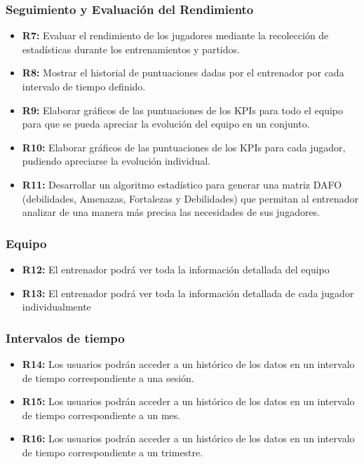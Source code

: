 \subsubsection{Seguimiento y Evaluación del Rendimiento}
\begin{itemize}
    \item \textbf{R7:} Evaluar el rendimiento de los jugadores mediante la recolección de estadísticas durante los entrenamientos y partidos.
    
    \item \textbf{R8:} Mostrar el historial de puntuaciones dadas por el entrenador por cada intervalo de  tiempo definido.
    
    \item \textbf{R9:} Elaborar gráficos de las puntuaciones de los KPIs para todo el equipo para que se pueda apreciar la evolución del equipo en un conjunto.
    
    \item \textbf{R10:} Elaborar gráficos de las puntuaciones de los KPIs para cada jugador, pudiendo apreciarse la evolución individual.
    
    \item \textbf{R11:} Desarrollar un algoritmo estadístico para generar una matriz DAFO (debilidades, Amenazas, Fortalezas y Debilidades) que permitan al entrenador analizar de una manera más precisa las necesidades de sus jugadores.
    
\end{itemize}

\subsubsection{Equipo}
\begin{itemize}
    \item \textbf{R12:} El entrenador podrá ver toda la información detallada del equipo
    
    \item \textbf{R13:} El entrenador podrá ver toda la información detallada de cada jugador individualmente
    
\end{itemize}

\subsubsection{Intervalos de tiempo}
\begin{itemize}
    \item \textbf{R14:} Los usuarios podrán acceder a un histórico de los datos en un intervalo de tiempo correspondiente a una sesión.
    
    \item \textbf{R15:} Los usuarios podrán acceder a un histórico de los datos en un intervalo de tiempo correspondiente a un mes.
    
    \item \textbf{R16:} Los usuarios podrán acceder a un histórico de los datos en un intervalo de tiempo correspondiente a un trimestre.
    
\end{itemize}

